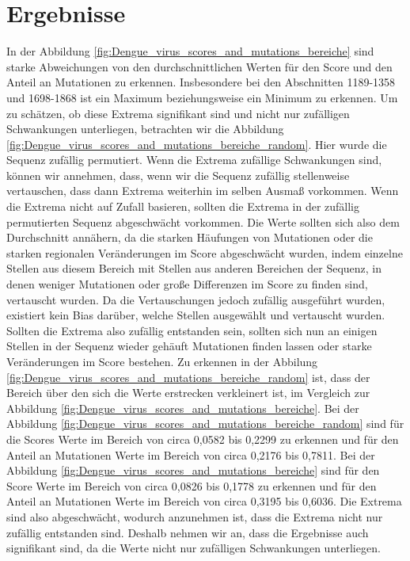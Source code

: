 \documentclass[german,version-2022-01]{uzl-thesis}
\begin{document}
\chapter{Ergebnisse}
In der Abbildung \ref{fig:Dengue_virus_scores_and_mutations_bereiche} sind starke Abweichungen von den durchschnittlichen Werten f\"ur den Score und den Anteil an Mutationen zu erkennen. Insbesondere bei den Abschnitten 1189-1358 und 1698-1868 ist ein Maximum beziehungsweise ein Minimum zu erkennen. Um zu sch\"atzen, ob diese Extrema signifikant sind und nicht nur zuf\"alligen Schwankungen unterliegen, betrachten wir die Abbildung \ref{fig:Dengue_virus_scores_and_mutations_bereiche_random}. Hier wurde die Sequenz zuf\"allig permutiert. Wenn die Extrema zuf\"allige Schwankungen sind, k\"onnen wir annehmen, dass, wenn wir die Sequenz zuf\"allig stellenweise vertauschen, dass dann Extrema weiterhin im selben Ausma\ss{} vorkommen. Wenn die Extrema nicht auf Zufall basieren, sollten die Extrema in der zuf\"allig permutierten Sequenz abgeschw\"acht vorkommen. Die Werte sollten sich also dem Durchschnitt ann\"ahern, da die starken H\"aufungen von Mutationen oder die starken regionalen Ver\"anderungen im Score abgeschw\"acht wurden, indem einzelne Stellen aus diesem Bereich mit Stellen aus anderen Bereichen der Sequenz, in denen weniger Mutationen oder gro\ss{}e Differenzen im Score zu finden sind, vertauscht wurden. Da die Vertauschungen jedoch zuf\"allig ausgef\"uhrt wurden, existiert kein Bias dar\"uber, welche Stellen ausgew\"ahlt und vertauscht wurden. Sollten die Extrema also zuf\"allig entstanden sein, sollten sich nun an einigen Stellen in der Sequenz wieder geh\"auft Mutationen finden lassen oder starke Ver\"anderungen im Score bestehen. 
Zu erkennen in der Abbilung \ref{fig:Dengue_virus_scores_and_mutations_bereiche_random} ist, dass der Bereich \"uber den sich die Werte erstrecken verkleinert ist, im Vergleich zur Abbildung \ref{fig:Dengue_virus_scores_and_mutations_bereiche}. Bei der Abbildung \ref{fig:Dengue_virus_scores_and_mutations_bereiche_random} sind f\"ur die Scores Werte im Bereich von circa 0,0582 bis 0,2299 zu erkennen und f\"ur den Anteil an Mutationen Werte im Bereich von circa 0,2176 bis 0,7811. Bei der Abbildung \ref{fig:Dengue_virus_scores_and_mutations_bereiche} sind f\"ur den Score Werte im Bereich von circa 0,0826 bis 0,1778 zu erkennen und f\"ur den Anteil an Mutationen Werte im Bereich von circa 0,3195 bis 0,6036. Die Extrema sind also abgeschw\"acht, wodurch anzunehmen ist, dass die Extrema nicht nur zuf\"allig entstanden sind. Deshalb nehmen wir an, dass die Ergebnisse auch signifikant sind, da die Werte nicht nur zuf\"alligen Schwankungen unterliegen.  
\end{document}
